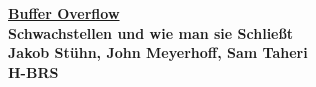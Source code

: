 \begin{titlepage}
    \begin{center}
        \Huge\bfseries\underline{Buffer Overflow}\\
        \vspace{1.5cm}
        {\Large\bfseries Schwachstellen und wie man sie Schließt}\\
        \vspace{1cm}
        {\Large Jakob Stühn, John Meyerhoff, Sam Taheri}\\
        \vspace{2.5cm}
        {\large H-BRS}
        \vfill
    \end{center}
\end{titlepage}

